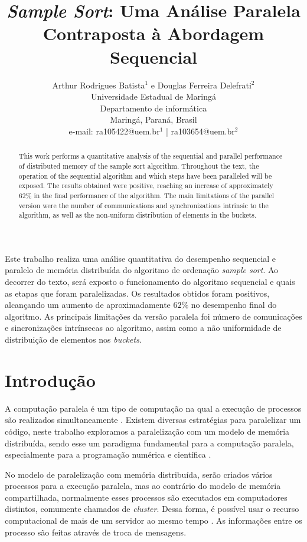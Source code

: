 \documentclass[letterpaper, 10 pt, conference]{ieeeconf}  %
\title{\LARGE \bf
\textit{Sample Sort}: Uma Análise Paralela Contraposta à Abordagem Sequencial}
\author{Arthur Rodrigues Batista$^{1}$ e Douglas Ferreira Delefrati$^{2}$%
 \\Universidade Estadual de Maringá\\
   Departamento de informática\\
   Maringá, Paraná, Brasil
 \\ e-mail: ra105422@uem.br$^{1}$ | ra103654@uem.br$^{2}$
}
\begin{document}
\maketitle
\thispagestyle{empty}
\pagestyle{empty}


\begin{abstract}
This work performs a quantitative analysis of the sequential and parallel performance of distributed memory of the sample sort  algorithm. Throughout the text, the operation of the sequential algorithm and which steps have been paralleled will be exposed. The results obtained were positive, reaching an increase of approximately 62\% in the final performance of the algorithm. The main limitations of the parallel version were the number of communications and synchronizations intrinsic to the algorithm, as well as the non-uniform distribution of elements in the buckets.

\end{abstract}

\begin{resumo}
Este trabalho realiza uma análise quantitativa do desempenho sequencial e paralelo de memória distribuída do algoritmo de ordenação \textit{sample sort}. Ao decorrer do texto, será exposto o funcionamento do algoritmo sequencial e quais as etapas que foram paralelizadas. Os resultados obtidos foram positivos, alcançando um aumento de aproximadamente $62\%$ no desempenho final do algoritmo. As principais limitações da versão paralela foi número de comunicações e sincronizações intrínsecas ao algoritmo, assim como a não uniformidade de distribuição de elementos nos \textit{buckets}.

\end{resumo}


\section{Introdução}
A computação paralela é um tipo de computação na qual a execução de processos são realizados simultaneamente \cite{c5}. Existem diversas estratégias para paralelizar um código, neste trabalho exploramos a paralelização com um modelo de memória distribuída, sendo esse um paradigma fundamental para a computação paralela, especialmente para a programação numérica e científica \cite{c7}. 

No modelo de paralelização com memória distribuída, serão criados vários processos para a execução paralela, mas ao contrário do modelo de memória compartilhada, normalmente esses processos são executados em computadores distintos, comumente chamados de \textit{cluster}. Dessa forma, é possível usar o recurso computacional de mais de um servidor ao mesmo tempo \cite{c6}. As informações entre os processo são feitas através de troca de mensagens.
 
\end{document}
